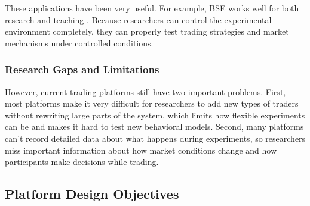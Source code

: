These applications have been very useful. For example, BSE works well for both research and teaching \citep{Cliff2018Open}. Because researchers can control the experimental environment completely, they can properly test trading strategies and market mechanisms under controlled conditions.

\subsubsection{Research Gaps and Limitations}

However, current trading platforms still have two important problems. First, most platforms make it very difficult for researchers to add new types of traders without rewriting large parts of the system, which limits how flexible experiments can be and makes it hard to test new behavioral models. Second, many platforms can't record detailed data about what happens during experiments, so researchers miss important information about how market conditions change and how participants make decisions while trading.

\subsection{Platform Design Objectives}
